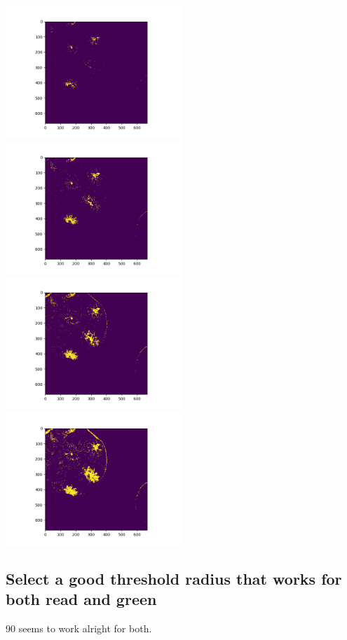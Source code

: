 \documentclass{article}
\begin{document}
        \includegraphics[height=50mm]{green_mask_45}
        \includegraphics[height=50mm]{green_mask_70}
        \includegraphics[height=50mm]{green_mask_90}
        \includegraphics[height=50mm]{green_mask_110}
    \subsection{Select a good threshold radius that works for both read and green}
        90 seems to work alright for both.
\end{document}
